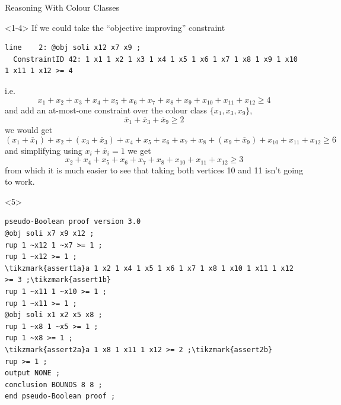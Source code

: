 \documentclass[aspectratio=169,compress,10pt]{beamer}
\begin{document}
\begin{frame}[fragile,t]{Reasoning With Colour Classes}%
\begin{onlyenv}<1-4>%
        If we could take the ``objective improving'' constraint
\begin{Verbatim}[commandchars=\\\{\},fontsize=\scriptsize]
line    2: @obj soli x12 x7 x9 ;
  ConstraintID 42: 1 x1 1 x2 1 x3 1 x4 1 x5 1 x6 1 x7 1 x8 1 x9 1 x10 1 x11 1 x12 >= 4
\end{Verbatim}
            i.e. \[
                x_1 + x_2 + x_3 + x_4 + x_5 + x_6 + x_7 + x_8 + x_9 + x_{10} + x_{11} + x_{12} \ge 4
            \]
            \pause
            and add an at-most-one constraint over the colour class $\{x_1, x_3, x_9\}$,
            \[\overline{x}_1 + \overline{x}_3 + \overline{x}_9 \ge 2\]
            \pause
we would get \[
    (x_1 + \overline{x}_1) + x_2 + (x_3 + \overline{x}_3) + x_4 + x_5 + x_6 + x_7 + x_8 + (x_9 +
            \overline{x}_9) + x_{10} + x_{11} + x_{12} \ge 6\]
        \pause
        and simplifying using $x_i + \overline{x}_i = 1$ we get \[
    x_2 + x_4 + x_5 + x_6 + x_7 + x_8 + x_{10} + x_{11} + x_{12} \ge 3\]
from which it is much easier to see that taking both vertices 10 and 11 isn't going to work.
\end{onlyenv}\begin{onlyenv}<5>%
%
%
\begin{Verbatim}[commandchars=\\\{\},codes={\catcode`$=3\catcode`^=7}]
pseudo-Boolean proof version 3.0
@obj soli x7 x9 x12 ;
rup 1 ~x12 1 ~x7 >= 1 ;
rup 1 ~x12 >= 1 ;
\tikzmark{assert1a}a 1 x2 1 x4 1 x5 1 x6 1 x7 1 x8 1 x10 1 x11 1 x12 >= 3 ;\tikzmark{assert1b}
rup 1 ~x11 1 ~x10 >= 1 ;
rup 1 ~x11 >= 1 ;
@obj soli x1 x2 x5 x8 ;
rup 1 ~x8 1 ~x5 >= 1 ;
rup 1 ~x8 >= 1 ;
\tikzmark{assert2a}a 1 x8 1 x11 1 x12 >= 2 ;\tikzmark{assert2b}
rup >= 1 ;
output NONE ;
conclusion BOUNDS 8 8 ;
end pseudo-Boolean proof ;
\end{Verbatim}

\end{onlyenv}
\end{frame}
\end{document}
